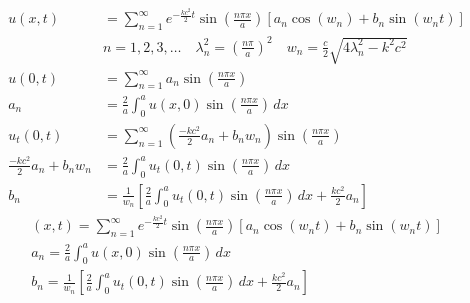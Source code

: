 \documentclass[../../HW06.tex]{subfiles}
\begin{document}
\begin{align*}
    u(x,t)                              & = \sum_{n=1}^{\infty} e^{-\frac{kc^{2}}{2}t}\sin\left( \frac{n\pi x}{a} \right) \left[ a_{n}\cos(w_{n}) + b_{n}\sin(w_{n}t) \right] \\
                                        & n=1,2,3,\dots \quad \lambda_{n}^{2}=\left( \frac{n \pi}{a} \right)^{2} \quad w_{n}=\frac{c}{2} \sqrt{4\lambda_{n}^{2}-k^{2}c^{2}}   \\
    u(0,t)                              & = \sum_{n=1}^{\infty} a_{n}\sin\left( \frac{n\pi x}{a} \right)                                                                      \\
    a_{n}                               & = \frac{2}{a} \int_{0}^{a}u(x,0)\sin\left( \frac{n\pi x}{a} \right)\,dx                                                             \\
    u_{t}(0,t)                          & = \sum_{n=1}^{\infty} \left( \frac{-kc^{2}}{2}a_{n} + b_{n}w_{n} \right)\sin\left( \frac{n\pi x}{a} \right)                         \\
    \frac{-kc^{2}}{2}a_{n} + b_{n}w_{n} & = \frac{2}{a}\int_{0}^{a} u_{t}(0,t) \sin\left( \frac{n\pi x}{a} \right)\,dx                                                        \\
    b_{n}                               & = \frac{1}{w_{n}} \left[ \frac{2}{a}\int_{0}^{a} u_{t}(0,t) \sin\left( \frac{n\pi x}{a} \right)\,dx + \frac{kc^{2}}{2}a_{n} \right]
\end{align*}
\begin{gather*}
    (x,t) = \sum_{n=1}^{\infty} e^{-\frac{kc^{2}}{2}t}\sin\left( \frac{n\pi x}{a} \right) \left[ a_{n}\cos(w_{n}t) + b_{n}\sin(w_{n}t) \right] \\
    a_{n} = \frac{2}{a} \int_{0}^{a}u(x,0)\sin\left( \frac{n\pi x}{a} \right)\,dx                                                             \\
    b_{n} = \frac{1}{w_{n}} \left[ \frac{2}{a}\int_{0}^{a} u_{t}(0,t) \sin\left( \frac{n\pi x}{a} \right)\,dx + \frac{kc^{2}}{2}a_{n} \right]
\end{gather*}
\end{document}

